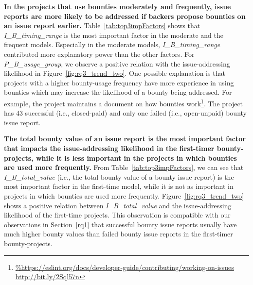 \textbf{In the projects that use bounties moderately and frequently, issue reports are more likely to be addressed if backers propose bounties on an issue report earlier.} Table~\ref{tab:top3impFactors} shows that \textit{I\_B\_timing\_range} is the most important factor in the moderate and the frequent models. Especially in the moderate models, \textit{I\_B\_timing\_range} contributed more explanatory power than the other factors. For \textit{P\_B\_usage\_group}, we observe a positive relation with the issue-addressing likelihood in Figure~\ref{fig:rq3_trend_two}. One possible explanation is that projects with a higher bounty-usage frequency have more experience in using bounties which may increase the likelihood of a bounty being addressed. For example, the  project maintains a document on how bounties work\footnote{\url{%
http://bit.ly/2Sql57n}}. The  project has 43 successful (i.e., closed-paid) and only one failed (i.e., open-unpaid) bounty issue report.


\textbf{The total bounty value of an issue report is the most important factor that impacts the issue-addressing likelihood in the first-timer bounty-projects, while it is less important in the projects in which bounties are used more frequently.} From Table~\ref{tab:top3impFactors}, we can see that \textit{I\_B\_total\_value} (i.e., the total bounty value of a bounty issue report) is the most important factor in the first-time model, while it is not as important in projects in which bounties are used more frequently. Figure~\ref{fig:rq3_trend_two} shows a positive relation between \textit{I\_B\_total\_value} and the issue-addressing likelihood of the first-time projects. This observation is compatible with our observations in Section~\ref{rq1} that successful bounty issue reports usually have much higher bounty values than failed bounty issue reports in the first-timer bounty-projects.






